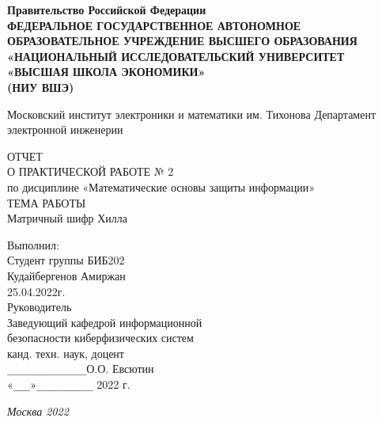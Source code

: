\documentclass[a4paper]{article}
\begin{document}
    \begin{titlepage}
        \centering
        {\Large\bfseries Правительство Российской Федерации     \\
            ФЕДЕРАЛЬНОЕ ГОСУДАРСТВЕННОЕ АВТОНОМНОЕ \\
            ОБРАЗОВАТЕЛЬНОЕ УЧРЕЖДЕНИЕ ВЫСШЕГО ОБРАЗОВАНИЯ \\
            «НАЦИОНАЛЬНЫЙ ИССЛЕДОВАТЕЛЬСКИЙ УНИВЕРСИТЕТ \\
            «ВЫСШАЯ ШКОЛА ЭКОНОМИКИ» \\
        (НИУ ВШЭ) }

        
        \vspace{1cm}
        
        {\Large Московский институт электроники и математики им. Тихонова Департамент электронной инженерии}
        
        \vspace{2cm}
        
        {\large ОТЧЕТ \\
            О ПРАКТИЧЕСКОЙ РАБОТЕ № 2 \\
            по дисциплине «Математические основы защиты информации» \\
            ТЕМА РАБОТЫ \\
            Матричный шифр Хилла
        }
        
        \vspace{6cm}
        \begin{flushright}
            {\large Выполнил: \\
            Студент группы БИБ202 \\
            Кудайбергенов Амиржан \\
            25.04.2022г.\\
            Руководитель \\
            Заведующий кафедрой информационной \\
            безопасности киберфизических систем \\
            канд. техн. наук, доцент \\
            \verb|______________|О.О. Евсютин \\
            «\verb|___|»\verb|__________| 2022 г. \\ }
        \end{flushright}
        
        \vfill
        
        {\itshape Москва 2022}
    \end{titlepage}
\end{document}
